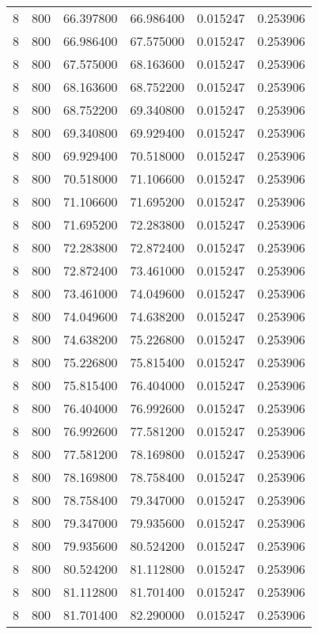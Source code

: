 \begin{longtable}{rrrrrr}
8 & 800 & 66.397800 & 66.986400 & 0.015247 & 0.253906 \\
8 & 800 & 66.986400 & 67.575000 & 0.015247 & 0.253906 \\
8 & 800 & 67.575000 & 68.163600 & 0.015247 & 0.253906 \\
8 & 800 & 68.163600 & 68.752200 & 0.015247 & 0.253906 \\
8 & 800 & 68.752200 & 69.340800 & 0.015247 & 0.253906 \\
8 & 800 & 69.340800 & 69.929400 & 0.015247 & 0.253906 \\
8 & 800 & 69.929400 & 70.518000 & 0.015247 & 0.253906 \\
8 & 800 & 70.518000 & 71.106600 & 0.015247 & 0.253906 \\
8 & 800 & 71.106600 & 71.695200 & 0.015247 & 0.253906 \\
8 & 800 & 71.695200 & 72.283800 & 0.015247 & 0.253906 \\
8 & 800 & 72.283800 & 72.872400 & 0.015247 & 0.253906 \\
8 & 800 & 72.872400 & 73.461000 & 0.015247 & 0.253906 \\
8 & 800 & 73.461000 & 74.049600 & 0.015247 & 0.253906 \\
8 & 800 & 74.049600 & 74.638200 & 0.015247 & 0.253906 \\
8 & 800 & 74.638200 & 75.226800 & 0.015247 & 0.253906 \\
8 & 800 & 75.226800 & 75.815400 & 0.015247 & 0.253906 \\
8 & 800 & 75.815400 & 76.404000 & 0.015247 & 0.253906 \\
8 & 800 & 76.404000 & 76.992600 & 0.015247 & 0.253906 \\
8 & 800 & 76.992600 & 77.581200 & 0.015247 & 0.253906 \\
8 & 800 & 77.581200 & 78.169800 & 0.015247 & 0.253906 \\
8 & 800 & 78.169800 & 78.758400 & 0.015247 & 0.253906 \\
8 & 800 & 78.758400 & 79.347000 & 0.015247 & 0.253906 \\
8 & 800 & 79.347000 & 79.935600 & 0.015247 & 0.253906 \\
8 & 800 & 79.935600 & 80.524200 & 0.015247 & 0.253906 \\
8 & 800 & 80.524200 & 81.112800 & 0.015247 & 0.253906 \\
8 & 800 & 81.112800 & 81.701400 & 0.015247 & 0.253906 \\
8 & 800 & 81.701400 & 82.290000 & 0.015247 & 0.253906 \\

\end{longtable}
